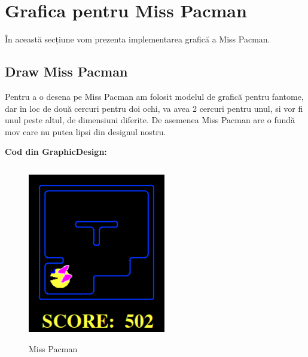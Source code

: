 \section{Grafica pentru Miss Pacman}
În această secțiune vom prezenta implementarea grafică a Miss Pacman.
\newline

\subsection{Draw Miss Pacman}
Pentru a o desena pe Miss Pacman am folosit modelul de grafică pentru fantome, dar în loc de două cercuri pentru doi ochi, va avea 2 cercuri pentru unul, si vor fi unul peste altul, de dimensiuni diferite. De asemenea Miss Pacman are o fundă mov care nu putea lipsi din designul nostru. \newline

\textbf{Cod din GraphicDesign:}
\inputminted[linenos]{python}{code/mspacman.py}

\begin{figure}[h]
    \centering
    \includegraphics[width=6cm]{text/images/miss pacman.png}\\
    \caption{Miss Pacman}
\end{figure}


\vspace{0.75cm}
\pagebreak
